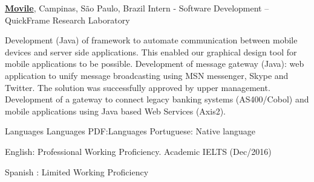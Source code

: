 \documentclass[letterpaper,MMMyyyy,nonstopmode]{simpleresumecv}
\begin{document}
\begin{Body}
\Entry
\href{https://www.movile.com/pt/}
{\textbf{Movile}},
Campinas, São Paulo, Brazil
\Gap
\BulletItem
Intern - Software Development
\hfill
{} --
\newline
QuickFrame Research Laboratory
\begin{Detail}
\SubBulletItem
  Development (Java) of framework to automate communication between mobile devices and server side applications. This enabled our graphical design tool  for mobile applications to be possible.
\SubBulletItem
  Development of message gateway (Java): web application to unify message broadcasting using MSN messenger, Skype and Twitter. The solution was successfully approved by upper management. 
\SubBulletItem
Development of a gateway to connect legacy banking systems (AS400/Cobol) and mobile applications using Java based Web Services (Axis2).
\end{Detail}




\Section
{Languages}
{Languages}
{PDF:Languages}
\BulletItem
Portuguese: Native language

\BulletItem
English: Professional Working Proficiency. Academic IELTS (Dec/2016)

\BulletItem
Spanish : Limited Working Proficiency









%
%


\end{Body}
\end{document}
